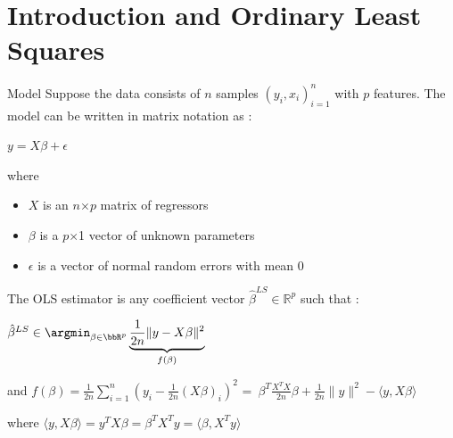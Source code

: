 \documentclass[unknownkeysallowed]{beamer}
\begin{document}




\section{Introduction and Ordinary Least Squares}
\label{sec:introdcution}



\begin{frame}{Model}
Suppose the data consists of $n$ samples $( y_i, x_i )^n_{i=1}$ with $p$ features.
\newline The model can be written in matrix notation as :
\begin{center}
$y=X\beta+\epsilon$
\end{center}
where
 \begin{itemize}
        \item $X$ is an $n$$\times$$p$ matrix of regressors
        \item $\beta$  is a $p$$\times$1 vector of unknown parameters
        \item $\epsilon$ is a vector of normal random errors with mean 0
    \end{itemize}
\end{frame}
\begin{frame}
The OLS estimator is any coefficient vector
$\hat\beta^{LS}\in\mathbb{R}^p$ such that :
\newline
\begin{center}
$\hat\beta^{LS} \in \argmin_{\beta \in \bbR^p}
\underbrace{\frac{1}{2n}\|y-X\beta\|^2 }_{f(\beta)}$
\end{center}
\vspace{0.5cm}
and $f(\beta)=\frac{1}{2n}\sum\limits_{i=1}^n (y_{i}-\frac{1}{2n}(X\beta)_{i})^2$ =\ $\beta^T\frac{X^TX}{2n}\beta+\frac{1}{2n}\|y\|^2- \langle y,X\beta\rangle$

\vspace{0.5cm}
where
$\langle y,X\beta\rangle=y^TX\beta=\beta^TX^Ty=\langle \beta,X^Ty\rangle$
\end{frame}
\end{document}
